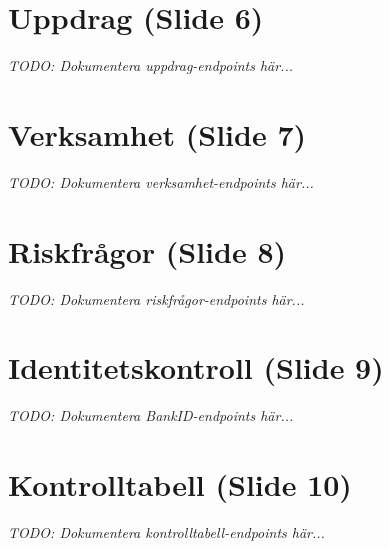 \documentclass[12pt,a4paper]{article}
\begin{document}
\section{Uppdrag (Slide 6)}

\textit{TODO: Dokumentera uppdrag-endpoints här...}

\newpage


\section{Verksamhet (Slide 7)}

\textit{TODO: Dokumentera verksamhet-endpoints här...}

\newpage


\section{Riskfrågor (Slide 8)}

\textit{TODO: Dokumentera riskfrågor-endpoints här...}

\newpage


\section{Identitetskontroll (Slide 9)}

\textit{TODO: Dokumentera BankID-endpoints här...}

\newpage

\section{Kontrolltabell (Slide 10)}

\textit{TODO: Dokumentera kontrolltabell-endpoints här...}

\newpage

\end{document}
